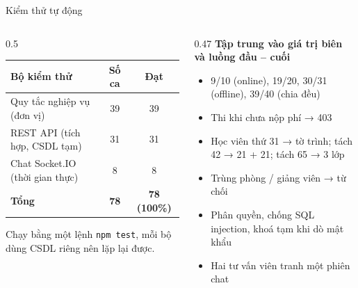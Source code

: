 \documentclass[aspectratio=169,11pt]{beamer}
\newcommand{\hd}[1]{\textbf{\color{white}#1}}
\newcommand{\headrow}{\rowcolor{navy}}
\begin{document}
\begin{frame}{Kiểm thử tự động}
  \begin{columns}[T]
    \begin{column}{0.5\linewidth}
      \small
      \begin{tabularx}{\linewidth}{|>{\raggedright\arraybackslash}X|c|c|}
        \hline
        \headrow \hd{Bộ kiểm thử} & \hd{Số ca} & \hd{Đạt} \\ \hline
        Quy tắc nghiệp vụ (đơn vị) & 39 & 39 \\ \hline
        REST API (tích hợp, CSDL tạm) & 31 & 31 \\ \hline
        Chat Socket.IO (thời gian thực) & 8 & 8 \\ \hline
        \textbf{Tổng} & \textbf{78} & \textbf{78 (100\%)} \\ \hline
      \end{tabularx}
      \vspace{8pt}

      Chạy bằng một lệnh \texttt{npm test}, mỗi bộ dùng CSDL riêng nên lặp lại được.
    \end{column}
    \begin{column}{0.47\linewidth}
      \textbf{Tập trung vào giá trị biên và luồng đầu – cuối}
      \begin{itemize}
        \item 9/10 (online), 19/20, 30/31 (offline), 39/40 (chia đều)
        \item Thi khi chưa nộp phí → 403
        \item Học viên thứ 31 → tờ trình; tách 42 → 21 + 21; tách 65 → 3 lớp
        \item Trùng phòng / giảng viên → từ chối
        \item Phân quyền, chống SQL injection, khoá tạm khi dò mật khẩu
        \item Hai tư vấn viên tranh một phiên chat
      \end{itemize}
    \end{column}
  \end{columns}
\end{frame}
\end{document}
